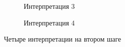 \documentclass{article}
\begin{document}
\begin{articletext}
\begin{figure}
\begin{subfigure}[b]{0.24\textwidth}
                \caption{Интерпретация 3}
        \end{subfigure}
        \hfill%
        \begin{subfigure}[b]{0.2\textwidth}
                \caption{Интерпретация 4}
        \end{subfigure}
        \caption{Четыре интерпретации на втором шаге}\label{step2}
\end{figure}


\end{articletext}
\end{document}
